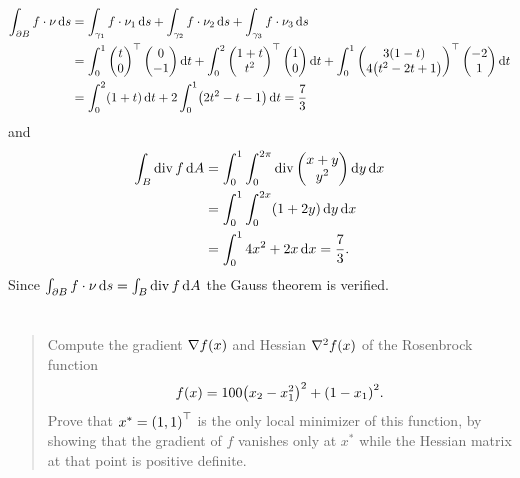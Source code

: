 \documentclass{exercise}
\begin{document}
	\begin{align*}
		\int_{\partial B} f \cdot \nu\d s &= \int_{\gamma_1}f \cdot \nu_1 \d s + \int_{\gamma_2}f \cdot \nu_2 \d s + \int_{\gamma_3}f \cdot \nu_3 \d s\\
		&= \int_0^1 \begin{pmatrix}
			t\\
			0
		\end{pmatrix}^\top \begin{pmatrix}
			0\\
			-1
		\end{pmatrix}\d t + \int_0^2 \begin{pmatrix}
			1 + t\\
			t^2
		\end{pmatrix}^\top \begin{pmatrix}
			1\\
			0
		\end{pmatrix}\d t + \int_0^1 \begin{pmatrix}
			3\parentheses*{1 - t}\\
			4\parentheses*{t^2 - 2t + 1}
		\end{pmatrix}^\top \begin{pmatrix}
			-2\\
			1
		\end{pmatrix}\d t\\
		&= \int_0^2 \parentheses*{1 + t}\d t + 2\int_0^1 \parentheses*{2t^2 - t - 1}\d t = \frac{7}{3}
	\end{align*}
	and
	\begin{align*}
		\int_B \div f\d A &= \int_0^1 \int_0^{2\pi}\div\begin{pmatrix}
			x + y\\
			y^2
		\end{pmatrix}\d y\d x\\
		&= \int_0^1 \int_0^{2x}\parentheses*{1 + 2y}\d y\d x\\
		&= \int_0^1 4x^2 + 2x\d x = \frac{7}{3}.
	\end{align*}
	Since \(\int_{\partial B}f \cdot \nu\d s = \int_B \div f\d A\) the Gauss theorem is verified.


	\section{}

	\begin{quote}
		Compute the gradient \(\nabla f\parentheses*{x}\) and Hessian \(\nabla^2 f\parentheses*{x}\) of the Rosenbrock function
		\[
			f\parentheses*{x} = 100\parentheses*{x_2 - x_1^2}^2 + \parentheses*{1 - x_1}^2.
		\]
		Prove that \(x^* = \parentheses*{1, 1}^\top\) is the only local minimizer of this function, by showing that the gradient of \(f\) vanishes only at \(x^*\) while the Hessian matrix at that point is positive definite.
	\end{quote}
\end{document}
